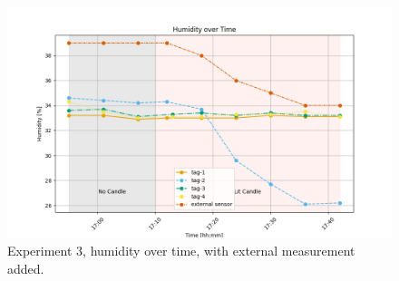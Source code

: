 \begin{figure}[ht!]
	\includegraphics[width=\linewidth]{graphics/exp/exp3_hum_plot_1.png}
	\caption{Experiment 3, humidity over time, with external measurement added.}
	\label{f:exp3_graphs_hum}
\end{figure}


